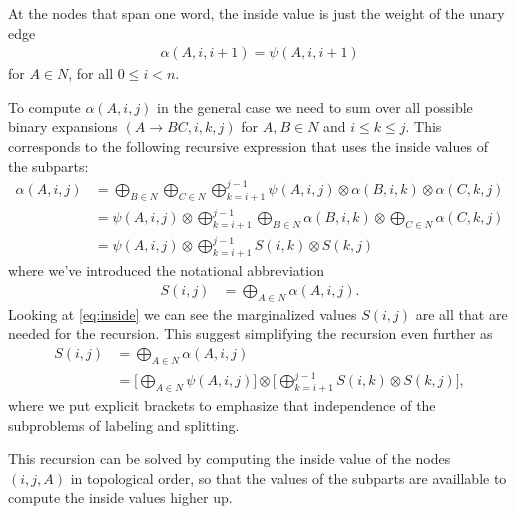   At the nodes that span one word, the inside value is just the weight of the unary edge
  \begin{align}
      \label{eq:inside-base}
      \alpha(A, i, i+1) = \psi(A, i, i+1)
  \end{align}
  for $A \in N$, for all $0 \leq i < n$.

  To compute $\alpha(A, i, j)$ in the general case we need to sum over all possible binary expansions $(A \to B C, i, k, j)$ for $A, B \in N$ and $i \leq k \leq j$. This corresponds to the following recursive expression that uses the inside values of the subparts:
  \begin{align*}
  \label{eq:inside}
    \alpha(A, i, j)
      &= \bigoplus_{B \in N} \bigoplus_{C \in N} \bigoplus_{k=i+1}^{j-1} \psi(A, i, j) \otimes \alpha(B,i,k) \otimes \alpha(C,k,j) \\
      &= \psi(A, i, j) \otimes \bigoplus_{k=i+1}^{j-1} \bigoplus_{B \in N} \alpha(B,i,k) \otimes \bigoplus_{C \in N} \alpha(C,k,j) \\
      &= \psi(A, i, j) \otimes \bigoplus_{k=i+1}^{j-1} S(i,k) \otimes S(k,j)
  \end{align*}
  where we've introduced the notational abbreviation
  \begin{align*}
      S(i,j) &= \bigoplus_{A \in N} \alpha(A,i,j).
  \end{align*}
  Looking at \ref{eq:inside} we can see the marginalized values $S(i, j)$ are all that are needed for the recursion. This suggest simplifying the recursion even further as
  \begin{align*}
  \label{eq:inside-simplified}
    S(i, j)
      &= \bigoplus_{A \in N} \alpha(A,i,j) \\
      &= \Bigg[ \bigoplus_{A \in N} \psi(A, i, j) \Bigg] \otimes \Bigg[\bigoplus_{k=i+1}^{j-1} S(i,k) \otimes  S(k,j) \Bigg],
  \end{align*}
  where we put explicit brackets to emphasize that independence of the subproblems of labeling and splitting.

  This recursion can be solved by computing the inside value of the nodes $(i, j, A)$ in topological order, so that the values of the subparts are availlable to compute the inside values higher up.

